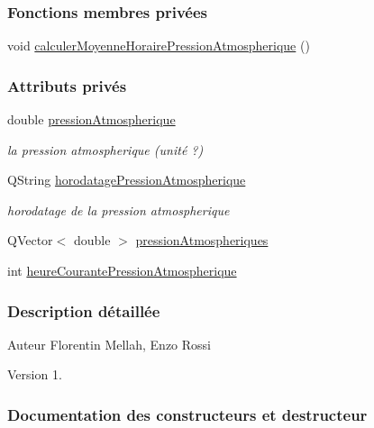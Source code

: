\subsubsection*{Fonctions membres privées}
\begin{DoxyCompactItemize}
\item 
void \hyperlink{class_infos_pression_atmospherique_a287f1f24726218868c8531365c1a22ec}{calculer\+Moyenne\+Horaire\+Pression\+Atmospherique} ()
\end{DoxyCompactItemize}
\subsubsection*{Attributs privés}
\begin{DoxyCompactItemize}
\item 
double \hyperlink{class_infos_pression_atmospherique_a69f31dc0d0ef59f8ced23e4663ee1ab8}{pression\+Atmospherique}
\begin{DoxyCompactList}\small\item\em la pression atmospherique (unité ?) \end{DoxyCompactList}\item 
Q\+String \hyperlink{class_infos_pression_atmospherique_aba207458a51a9290e4f2e0795983a44e}{horodatage\+Pression\+Atmospherique}
\begin{DoxyCompactList}\small\item\em horodatage de la pression atmospherique \end{DoxyCompactList}\item 
Q\+Vector$<$ double $>$ \hyperlink{class_infos_pression_atmospherique_a38218b11dc9fb22aca7525f93155a26c}{pression\+Atmospheriques}
\item 
int \hyperlink{class_infos_pression_atmospherique_ab3fa5c89841cf03f371ef7848b8bc958}{heure\+Courante\+Pression\+Atmospherique}
\end{DoxyCompactItemize}


\subsubsection{Description détaillée}
\begin{DoxyAuthor}{Auteur}
Florentin Mellah, Enzo Rossi
\end{DoxyAuthor}
\begin{DoxyVersion}{Version}
1. 
\end{DoxyVersion}


\subsubsection{Documentation des constructeurs et destructeur}
\mbox{\label{class_infos_pression_atmospherique_aade2e8de08264974305962bea890bf68}} 
